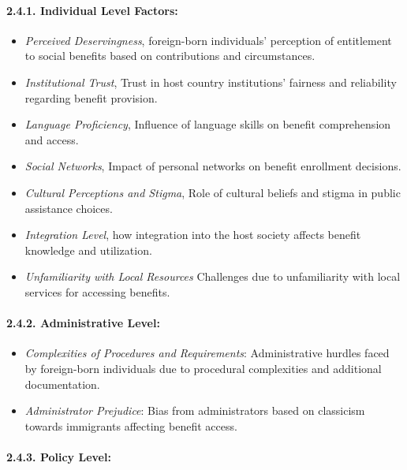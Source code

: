 \documentclass[
]{article}
\providecommand{\tightlist}{%
  \setlength{\itemsep}{0pt}\setlength{\parskip}{0pt}}
\begin{document}
\hypertarget{individual-level-factors}{%
\paragraph{2.4.1. Individual Level
Factors:}\label{individual-level-factors}}

\begin{itemize}
\tightlist
\item
  \emph{Perceived Deservingness}, foreign-born individuals' perception
  of entitlement to social benefits based on contributions and
  circumstances.
\item
  \emph{Institutional Trust}, Trust in host country institutions'
  fairness and reliability regarding benefit provision.
\item
  \emph{Language Proficiency}, Influence of language skills on benefit
  comprehension and access.
\item
  \emph{Social Networks}, Impact of personal networks on benefit
  enrollment decisions.
\item
  \emph{Cultural Perceptions and Stigma}, Role of cultural beliefs and
  stigma in public assistance choices.
\item
  \emph{Integration Level}, how integration into the host society
  affects benefit knowledge and utilization.
\item
  \emph{Unfamiliarity with Local Resources} Challenges due to
  unfamiliarity with local services for accessing benefits.
\end{itemize}

\hypertarget{administrative-level}{%
\paragraph{2.4.2. Administrative Level:}\label{administrative-level}}

\begin{itemize}
\tightlist
\item
  \emph{Complexities of Procedures and Requirements}: Administrative
  hurdles faced by foreign-born individuals due to procedural
  complexities and additional documentation.
\item
  \emph{Administrator Prejudice}: Bias from administrators based on
  classicism towards immigrants affecting benefit access.
\end{itemize}

\pagebreak

\hypertarget{policy-level}{%
\paragraph{2.4.3. Policy Level:}\label{policy-level}}
\end{document}
